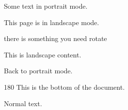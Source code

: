 \documentclass{article}
\begin{document}
Some text in portrait mode.

\begin{landscape}
This page is in landscape mode.
\end{landscape}

\afterpage{\clearpage}
\begin{landscape}
    there is something you need rotate
\end{landscape}

\begin{landscape}
    This is landscape content.
\end{landscape}

Back to portrait mode.

\begin{turn}{180}
    This is the bottom of the document.
\end{turn}


Normal text.

\end{document}
